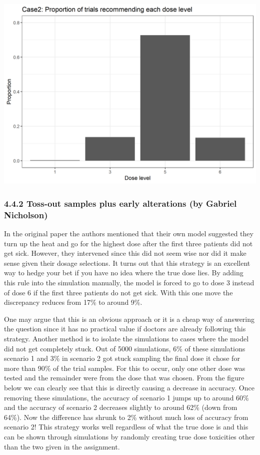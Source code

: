 \documentclass[
]{article}
\begin{document}
\includegraphics{zikai_sim_results/Case2_Proportion of trials recommending each dose level.png}

\hypertarget{toss-out-samples-plus-early-alterations-by-gabriel-nicholson}{%
\subsubsection{4.4.2 Toss-out samples plus early alterations (by Gabriel
Nicholson)}\label{toss-out-samples-plus-early-alterations-by-gabriel-nicholson}}

In the original paper the authors mentioned that their own model
suggested they turn up the heat and go for the highest dose after the
first three patients did not get sick. However, they intervened since
this did not seem wise nor did it make sense given their dosage
selections. It turns out that this strategy is an excellent way to hedge
your bet if you have no idea where the true dose lies. By adding this
rule into the simulation manually, the model is forced to go to dose 3
instead of dose 6 if the first three patients do not get sick. With this
one move the discrepancy reduces from 17\% to around 9\%.

One may argue that this is an obvious approach or it is a cheap way of
answering the question since it has no practical value if doctors are
already following this strategy. Another method is to isolate the
simulations to cases where the model did not get completely stuck. Out
of 5000 simulations, 6\% of these simulations scenario 1 and 3\% in
scenario 2 got stuck sampling the final dose it chose for more than 90\%
of the trial samples. For this to occur, only one other dose was tested
and the remainder were from the dose that was chosen. From the figure
below we can clearly see that this is directly causing a decrease in
accuracy. Once removing these simulations, the accuracy of scenario 1
jumps up to around 60\% and the accuracy of scenario 2 decreases
slightly to around 62\% (down from 64\%). Now the difference has shrunk
to 2\% without much loss of accuracy from scenario 2! This strategy
works well regardless of what the true dose is and this can be shown
through simulations by randomly creating true dose toxicities other than
the two given in the assignment.
\end{document}
